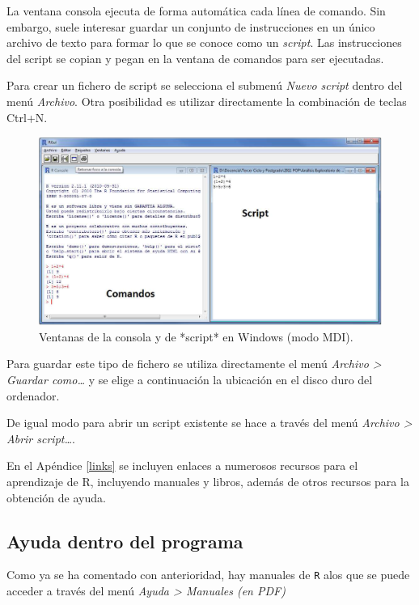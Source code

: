 \documentclass[]{book}
\begin{document}
La ventana consola ejecuta de forma automática cada línea de comando.
Sin embargo, suele interesar guardar un conjunto de instrucciones en un
único archivo de texto para formar lo que se conoce como un
\emph{script}. Las instrucciones del script se copian y pegan en la
ventana de comandos para ser ejecutadas.

Para crear un fichero de script se selecciona el submenú \emph{Nuevo
script} dentro del menú \emph{Archivo}. Otra posibilidad es utilizar
directamente la combinación de teclas Ctrl+N.

\begin{figure}[!htb]

{\centering \includegraphics[width=0.7\linewidth]{figuras/script} 

}

\caption{Ventanas de la consola y de *script* en Windows (modo MDI).}\label{fig:script}
\end{figure}

Para guardar este tipo de fichero se utiliza directamente el menú
\emph{Archivo \textgreater{} Guardar como\ldots{}} y se elige a
continuación la ubicación en el disco duro del ordenador.

De igual modo para abrir un script existente se hace a través del menú
\emph{Archivo \textgreater{} Abrir script\ldots{}}.

En el Apéndice \ref{links} se incluyen enlaces a numerosos recursos para
el aprendizaje de R, incluyendo manuales y libros, además de otros
recursos para la obtención de ayuda.

\subsection{Ayuda dentro del programa}\label{ayuda-dentro-del-programa}

Como ya se ha comentado con anterioridad, hay manuales de \texttt{R}
alos que se puede acceder a través del menú \emph{Ayuda \textgreater{}
Manuales (en PDF)}
\end{document}
